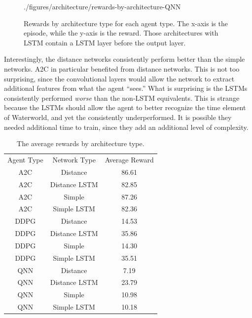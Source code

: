 \begin{figure}[!ht]
    {./figures/architecture/rewards-by-architecture-QNN}
    \caption{
        Rewards by architecture type for each agent type.
        The x-axis is the episode, while the y-axis is the reward.
        Those architectures with LSTM contain a LSTM layer before the output layer.
    }
    \label{fig:rewards-by-architecture}
\end{figure}

Interestingly, the distance networks consistently perform better than the simple
networks.
A2C in particular benefited from distance networks.
This is not too surprising, since the convolutional layers would allow the network to
extract additional features from what the agent ``sees.''
What is surprising is the LSTMs consistently performed \textit{worse} than the
non-LSTM equivalents.
This is strange because the LSTMs should allow the agent to better recognize the time
element of Waterworld, and yet the consistently underperformed.
It is possible they needed additional time to train, since they add an additional
level of complexity.

\begin{table}[!htbp]
    \renewcommand{\arraystretch}{1.3}

    \caption{The average rewards by architecture type.}
    \label{tab:architecture-average-reward}

    \centering
    \begin{tabular}{|c|c|c|}
        \hline
        Agent Type & Network Type       & Average Reward \\
        \hhline{|=|=|=|}
        A2C & Distance       & 86.61          \\
        \hline
        A2C & Distance LSTM  & 82.85          \\
        \hline
        A2C & Simple         & 87.26          \\
        \hline
        A2C & Simple LSTM    & 82.36          \\
        \hline
        DDPG & Distance      & 14.53          \\
        \hline
        DDPG & Distance LSTM & 35.86          \\
        \hline
        DDPG & Simple        & 14.30          \\
        \hline
        DDPG & Simple LSTM   & 35.51          \\
        \hline
        QNN & Distance       & 7.19           \\
        \hline
        QNN & Distance LSTM  & 23.79          \\
        \hline
        QNN & Simple         & 10.98          \\
        \hline
        QNN & Simple LSTM    & 10.18          \\
        \hline
    \end{tabular}
\end{table}

